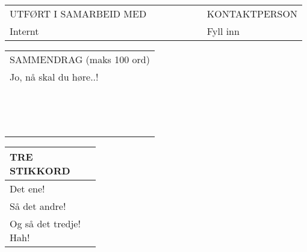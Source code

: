 \vspace{4mm}

\begin{tabular}{|>{\raggedright\arraybackslash}m{0.67\linewidth}|>{\raggedright\arraybackslash}m{0.305\linewidth}|} 
\hline
\vspace{1mm}UTFØRT I SAMARBEID MED & \vspace{1mm}KONTAKTPERSON \\
Internt & Fyll inn \\ \hline
\end{tabular}

\vspace{4mm}

\begin{tabular}{|m{1\linewidth}|}
\hline
\vspace{1mm}SAMMENDRAG (maks 100 ord) \\
Jo, nå skal du høre..!  \\ 
\\
\\
\\
\\
\\
\\
\\
\\
\\
\\
\\
\\
\\
\\

\hline
\end{tabular}

\vfill

\flushleft \begin{tabular}{|m{0.3\linewidth}|}
\hline
\vspace{1mm}TRE STIKKORD \\ \hline
\vspace{1mm}Det ene!\vspace{1mm}\\ \hline
\vspace{1mm}Så det andre! \vspace{1mm}\\ \hline
\vspace{1mm}Og så det tredje! Hah!\vspace{1mm} \\ \hline
\end{tabular}